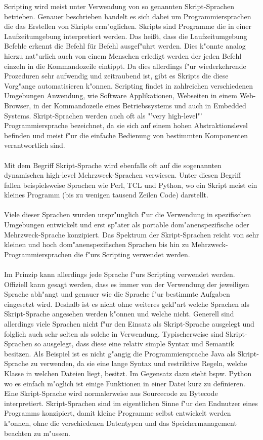 \documentclass[a4paper,12pt]{scrreprt}
\begin{document}
Scripting wird meist unter Verwendung von so genannten Skript-Sprachen betrieben. Genauer beschrieben handelt es sich dabei um Programmiersprachen die das Erstellen von Skripts erm"oglichen. Skripts sind Programme die in einer Laufzeitumgebung interpretiert werden. Das heißt, dass die Laufzeitumgebung Befehle erkennt die Befehl für Befehl ausgef"uhrt werden.  Dies k"onnte analog hierzu nat"urlich auch von einem Menschen erledigt werden der jeden Befehl einzeln in die Kommandozeile eintippt. Da dies allerdings f"ur wiederkehrende Prozeduren sehr aufwendig und zeitraubend ist, gibt es Skripts die diese Vorg"ange automatisieren k"onnen. Scripting findet in zahlreichen verschiedenen Umgebungen Anwendung, wie Software Applikationen, Webseiten in einem Web-Browser, in der Kommandozeile eines Betriebssystems und auch in Embedded Systems. Skript-Sprachen werden auch oft als "'very high-level"' Programmiersprache bezeichnet, da sie sich auf einem hohen Abstraktionslevel befinden und meist f"ur die einfache Bedienung von bestimmten Komponenten verantwortlich sind.\\\\Mit dem Begriff Skript-Sprache wird ebenfalls oft auf die sogenannten dynamischen high-level Mehrzweck-Sprachen verwiesen. Unter diesen Begriff fallen beispielsweise Sprachen wie Perl, TCL und Python, wo ein Skript meist ein kleines Programm (bis zu wenigen tausend Zeilen Code) darstellt.\\\\Viele dieser Sprachen wurden urspr"unglich f"ur die Verwendung in spezifischen Umgebungen entwickelt und erst sp"ater als portable dom"anenspezifische oder Mehrzweck-Sprache konzipiert. Das Spektrum der Skript-Sprachen reicht von sehr kleinen und hoch dom"anenspezifischen Sprachen bis hin zu Mehrzweck-Programmiersprachen die f"urs Scripting verwendet werden.\\\\ Im Prinzip kann allerdings jede Sprache f"urs Scripting verwendet werden. Offiziell kann gesagt werden, dass es immer von der Verwendung der jeweiligen Sprache abh"angt und genauer wie die Sprache f"ur bestimmte Aufgaben eingesetzt wird. Deshalb ist es nicht ohne weiteres gekl"art welche Sprachen als Skript-Sprache angesehen werden k"onnen und welche nicht. Generell sind allerdings viele Sprachen nicht f"ur den Einsatz als Skript-Sprache ausgelegt und folglich auch sehr selten als solche in Verwendung. Typischerweise sind Skript-Sprachen so ausgelegt, dass diese eine relativ simple Syntax und Semantik besitzen. Als Beispiel ist es nicht g"angig die Programmiersprache Java als Skript-Sprache zu verwenden, da sie eine lange Syntax und restriktive Regeln, welche Klasse in welchen Dateien liegt, besitzt. Im Gegensatz dazu steht bspw. Python wo es einfach m"oglich ist einige Funktionen in einer Datei kurz zu definieren. Eine Skript-Sprache wird normalerweise aus Sourcecode zu Bytecode interpretiert. Skript-Sprachen sind im eigentlichen Sinne f"ur den Endnutzer eines Programms konzipiert, damit kleine Programme selbst entwickelt werden k"onnen, ohne die verschiedenen Datentypen und das Speichermanagement beachten zu m"ussen. 
\end{document}
